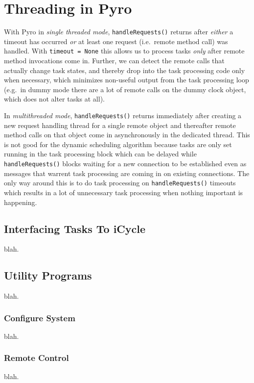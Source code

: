 \documentclass[11pt,a4paper]{article}
\begin{document}
\section{Threading in Pyro} \label{pyro-appendix}

With Pyro in {\em single threaded mode}, \verb#handleRequests()# returns
after {\em either} a timeout has occurred {\em or} at least one request
(i.e.\ remote method call) was handled. With \verb#timeout = None# this
allows us to process tasks {\em only} after remote method invocations
come in.  Further, we can detect the remote calls that actually change
task states, and thereby drop into the task processing code only when
necessary, which minimizes non-useful output from the task processing
loop (e.g.\ in dummy mode there are a lot of remote calls on the dummy
clock object, which does not alter tasks at all). 

In {\em multithreaded mode}, \verb#handleRequests()# returns immediately
after creating a new request handling thread for a single remote object
and thereafter remote method calls on that object come in asynchronously
in the dedicated thread. This is not good for the dynamic scheduling
algorithm because tasks are only set running in the task processing
block which can be delayed while \verb#handleRequests()# blocks waiting
for a new connection to be established even as messages that warrent
task processing are coming in on existing connections. The only way
around this is to do task processing on \verb#handleRequests()# timeouts
which results in a lot of unnecessary task processing when nothing
important is happening.


\subsection{Interfacing Tasks To iCycle}
blah.

\subsection{Utility Programs}
blah.

\subsubsection{Configure System}
blah.

\subsubsection{Remote Control}
blah.
\end{document}
